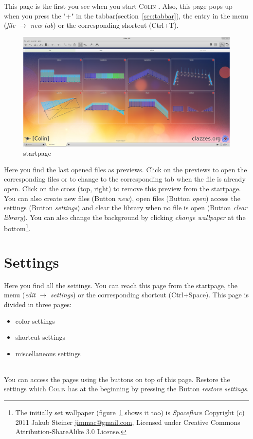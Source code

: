 \documentclass[a4paper,11pt]{report}
\newcommand{\Colin}[0]{\textsc{Colin }}
\begin{document}
This page is the first you see when you start \Colin. Also, this page pops up when you press the "+" in the tabbar(section~\ref{sec:tabbar}), the entry in the menu (\textit{file} $\rightarrow$ \textit{new tab}) or the corresponding shortcut (Ctrl+T). 
\begin{figure}[H]
\includegraphics[width=\textwidth]{../pictures/startpage.png}
\caption{startpage}
\label{pic:startpage}
\end{figure}
Here you find the last opened files as previews. Click on the previews to open the corresponding files or to change to the corresponding tab when the file is already open. Click on the cross (top, right) to remove this preview from the startpage. You can also create new files (Button \textit{new}), open files (Button \textit{open}) access the settings (Button \textit{settings}) and clear the library when no file is open (Button \textit{clear library}). You can also change the background by clicking \textit{change wallpaper} at the bottom\footnote{The initially set wallpaper (figure~\ref{pic:startpage} shows it too) is \textit{Spaceflare} Copyright (c) 2011 Jakub Steiner \href{jimmac@gmail.com}{jimmac@gmail.com}, Licensed under Creative Commons Attribution-ShareAlike 3.0 License. }. 

\section{Settings}
\label{sec:settings}
Here you find all the settings. You can reach this page from the startpage, the menu (\textit{edit} $\rightarrow$ \textit{settings}) or the corresponding shortcut (Ctrl+Space). This page is divided in three pages:
\begin{itemize}
	\item color settings
	\item shortcut settings
	\item miscellaneous settings
\end{itemize}\\
You can access the pages using the buttons on top of this page. Restore the settings which \Colin has at the beginning by pressing the Button \textit{restore settings}. 
\end{document}
